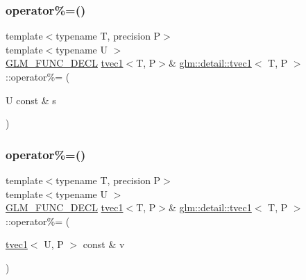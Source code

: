 \mbox{\label{structglm_1_1detail_1_1tvec1_a744a1362b6f4f9814ac695f7790b3fbf}} 
\subsubsection{\texorpdfstring{operator\%=()}{operator\%=()}\hspace{0.1cm}{\footnotesize\ttfamily [1/4]}}
{\footnotesize\ttfamily template$<$typename T, precision P$>$ \\
template$<$typename U $>$ \\
\hyperlink{setup_8hpp_ab2d052de21a70539923e9bcbf6e83a51}{G\+L\+M\+\_\+\+F\+U\+N\+C\+\_\+\+D\+E\+CL} \hyperlink{structglm_1_1detail_1_1tvec1}{tvec1}$<$T, P$>$\& \hyperlink{structglm_1_1detail_1_1tvec1}{glm\+::detail\+::tvec1}$<$ T, P $>$\+::operator\%= (\begin{DoxyParamCaption}\item[{U const \&}]{s }\end{DoxyParamCaption})}

\mbox{\label{structglm_1_1detail_1_1tvec1_a99b8f92366abc26677caf3ad5befb4a2}} 
\subsubsection{\texorpdfstring{operator\%=()}{operator\%=()}\hspace{0.1cm}{\footnotesize\ttfamily [2/4]}}
{\footnotesize\ttfamily template$<$typename T, precision P$>$ \\
template$<$typename U $>$ \\
\hyperlink{setup_8hpp_ab2d052de21a70539923e9bcbf6e83a51}{G\+L\+M\+\_\+\+F\+U\+N\+C\+\_\+\+D\+E\+CL} \hyperlink{structglm_1_1detail_1_1tvec1}{tvec1}$<$T, P$>$\& \hyperlink{structglm_1_1detail_1_1tvec1}{glm\+::detail\+::tvec1}$<$ T, P $>$\+::operator\%= (\begin{DoxyParamCaption}\item[{\hyperlink{structglm_1_1detail_1_1tvec1}{tvec1}$<$ U, P $>$ const \&}]{v }\end{DoxyParamCaption})}

